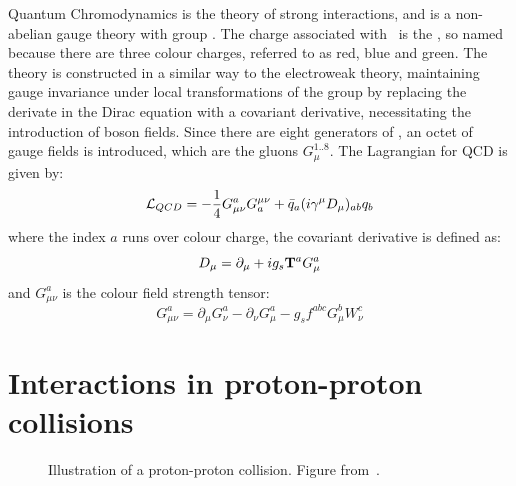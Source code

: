 Quantum Chromodynamics is the theory of strong interactions, and is a
non-abelian gauge theory with group \suthree. The charge associated with
\suthree\ is the , so named because there are three colour
charges, referred to as red, blue and green. The theory is constructed
in a similar way to the electroweak theory, maintaining gauge invariance under
local transformations of the group by replacing the derivate in the Dirac equation
with a covariant derivative, necessitating the introduction of boson fields.
Since there are eight generators of \suthree, an octet of gauge fields is
introduced, which are the gluons $G_{\mu}^{1..8}$. The Lagrangian for QCD is
given by:
\begin{equation}
\mathcal{L}_{QCD} = -\frac{1}{4}G^{a}_{\mu\nu}G_{a}^{\mu\nu} +
\bar{q}_{a}(i\gamma^{\mu} D_{\mu})_{ab}q_{b}
\end{equation}
where the index $a$ runs over colour charge, the covariant derivative is defined
as:
\begin{equation}
D_{\mu}  =  \partial_{\mu} + ig_{s}{\bf T}^{a} G^{a}_{\mu}
\end{equation}
and $G^{a}_{\mu\nu}$ is the colour field strength tensor:
\begin{equation}
 G^{a}_{\mu\nu} =
\partial_{\mu} G^{a}_{\nu} - \partial_{\nu} G^{a}_{\mu} - g_{s} f^{abc} G^{b}_{\mu}
W^{c}_{\nu}
\end{equation}

\section{Interactions in proton-proton collisions}
\label{sec:Theory-ppInteractions}

\begin{figure}
\centering
        \vspace{-5mm}
    \caption[Illustration of a proton-proton collision.] {\small
Illustration of a proton-proton collision. Figure from~\cite{Campbell:2006wx}.
}
    \label{fig:pp-event}
\end{figure}

